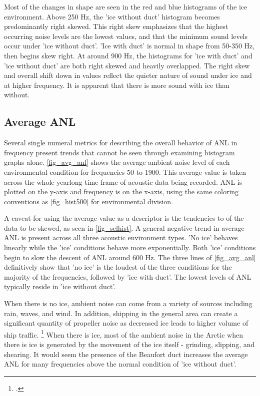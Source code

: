 Most of the changes in shape are seen in the red and blue histograms of the ice environment. Above 250 Hz, the 'ice without duct' histogram becomes predominantly right skewed. This right skew emphasizes that the highest occurring noise levels are the lowest values, and that the minimum sound levels occur under 'ice without duct'. 'Ice with duct' is normal in shape from 50-350 Hz, then begins skew right. At around 900 Hz, the histograms for 'ice with duct' and 'ice without duct' are both right skewed and heavily overlapped. The right skew and overall shift down in values reflect the quieter nature of sound under ice and at higher frequency. It is apparent that there is more sound with ice than without.




\subsection{Average ANL} \label{sec_avg_anl}
Several single numeral metrics for describing the overall behavior of ANL in frequency present trends that cannot be seen through examining histogram graphs alone. \autoref{fig_avg_anl} shows the average ambient noise level of each environmental condition for frequencies 50 to 1900. This average value is taken across the whole yearlong time frame of acoustic data being recorded. ANL is plotted on the y-axis and frequency is on the x-axis, using the same coloring conventions as \autoref{fig_hist500} for environmental division.

A caveat for using the average value as a descriptor is the tendencies to of the data to be skewed, as seen in \autoref{fig_selhist}. A general negative trend in average ANL is present across all three acoustic environment types. 'No ice' behaves linearly while the 'ice' conditions behave more exponentially. Both 'ice' conditions begin to slow the descent of ANL around 600 Hz. The three lines of \autoref{fig_avg_anl} definitively show that 'no ice' is the loudest of the three conditions for the majority of the frequencies, followed by 'ice with duct'. The lowest levels of ANL typically reside in 'ice without duct'.

When there is no ice, ambient noise can come from a variety of sources including rain, waves, and wind. In addition, shipping in the general area can create a significant quantity of propeller noise as decreased ice leads to higher volume of ship traffic. \footcite[]{halliday2020potential} When there is ice, most of the ambient noise in the Arctic when there is ice is generated by the movement of the ice itself - grinding, slipping, and shearing. It would seem the presence of the Beaufort duct increases the average ANL for many frequencies above the normal condition of 'ice without duct'. 



